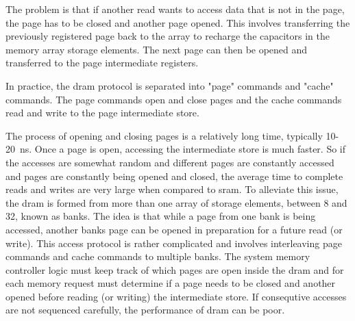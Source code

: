 \iffalse The issue with \acp{dram} is when a storage cell is read, the capacitor is discharged. In addition, sensing this discharging capacitor takes a long time when compared to the \ac{sram} cell.\fi

The problem is that if another read wants to access data that is not in the page, the page has to be closed and another page opened. 
This involves transferring the previously registered page back to the array to recharge the capacitors in the memory array storage elements. 
The next page can then be opened and transferred to the page intermediate registers.

In practice, the \ac{dram} protocol is separated into "page" commands and "cache" commands. The page commands open and close pages and the cache commands read and write to the page intermediate store.

The process of opening and closing pages is a relatively long time, typically 10-20\SI[per-mode=symbol]{}{\nano\second}. Once a page is open, accessing the intermediate store is much faster.
So if the accesses are somewhat random and different pages are constantly accessed and pages are constantly being opened and closed, the average time to complete reads and writes are very large when compared to \ac{sram}.
To alleviate this issue, the \ac{dram} is formed from more than one array of storage elements, between 8 and 32, known as banks. The idea is that while a page from one bank is being accessed, another banks page can be opened in preparation for a future read (or write).
This access protocol is rather complicated and involves interleaving page commands and cache commands to multiple banks. 
The system memory controller logic must keep track of which pages are open inside the \ac{dram} and for each memory request must determine if a page needs to be closed and another opened before reading (or writing) the intermediate store.
If consequtive accesses are not sequenced carefully, the performance of \ac{dram} can be poor.

